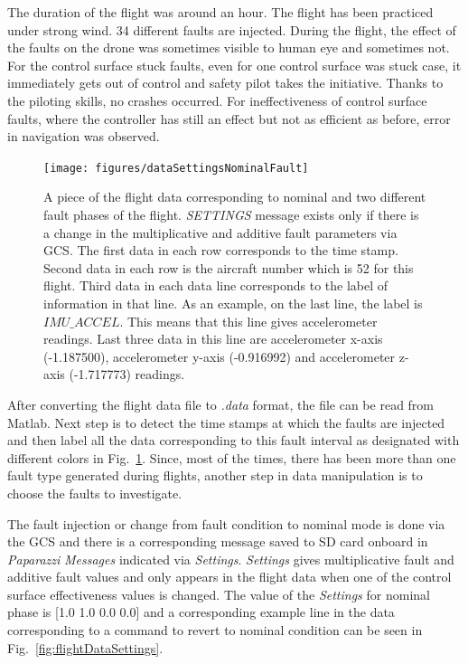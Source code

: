 The duration of the flight was around an hour. 
The flight has been practiced under strong wind. 
34 different faults are injected.
During the flight, the effect of the faults on the drone was sometimes visible to human eye and sometimes not. 
For the control surface stuck faults, even for one control surface was stuck case, it immediately gets out of control and safety pilot takes the initiative. 
Thanks to the piloting skills, no crashes occurred. 
For ineffectiveness of control surface faults, where the controller has still an effect but not as efficient as before, error in navigation was observed.  

\begin{figure}
\begin{center}
\texttt{[image: figures/dataSettingsNominalFault]}    %
\caption{A piece of the flight data corresponding to nominal and two different fault phases of the flight. \emph{SETTINGS} message exists only if there is a change in the multiplicative and additive fault parameters via GCS. The first data in each row corresponds to the time stamp. Second data in each row is the aircraft number which is 52 for this flight. Third data in each data line corresponds to the label of information in that line. As an example, on the last line, the label is $IMU\_ACCEL$. This means that this line gives accelerometer readings. Last three data in this line are accelerometer x-axis (-1.187500), accelerometer y-axis (-0.916992) and accelerometer z-axis (-1.717773) readings.} 
\label{fig:dataSettingsNominalFault}
\end{center}
\end{figure}


After converting the flight data file to \emph{.data} format, the file can be read from Matlab. Next step is to detect the time stamps at which the faults are injected and then label all the data corresponding to this fault interval as designated with different colors in Fig.~\ref{fig:dataSettingsNominalFault}. 
Since, most of the times, there has been more than one fault type generated during flights, another step in data manipulation is to choose the faults to investigate. 

The fault injection or change from fault condition to nominal mode is done via the GCS and there is a corresponding message saved to SD card onboard in \emph{Paparazzi} \emph{Messages} indicated via \emph{Settings}. 
\emph{Settings} gives multiplicative fault and additive fault values and only appears in the flight data when one of the control surface effectiveness values is changed. 
The value of the \emph{Settings} for nominal phase is [1.0 1.0 0.0 0.0] and a corresponding example line in the data corresponding to a command to revert to nominal condition can be seen in Fig.~\ref{fig:flightDataSettings}. 

